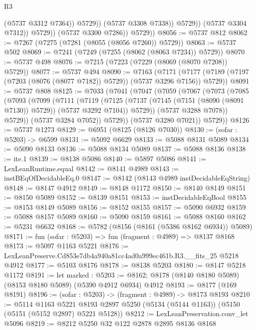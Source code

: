 \begin{lexlean}{R3}
\begin{coremodule}
                            (@5737 @3312 @7364))
                          @5729))
                      (@5737 @3308 @7338))
                    @5729))
                (@5737 @3304 @7312))
              @5729))
          (@5737 @3300 @7286))
        @5729))
@8056 := @5737 @812
@8062 := @7267 (@7275 (@7281 (@8055 (@8056 @7260)) @5729))
@8063 := @5737 @502
@8069 := @7241 (@7249 (@7255 (@8062 (@8063 @7234)) @5729))
@8070 := @5737 @498
@8076 := @7215 (@7223 (@7229 (@8069 (@8070 @7208)) @5729))
@8077 := @5737 @494
@8090 := @7163
    (@7171 (@7177 (@7189 (@7197 (@7203 (@8076 (@8077 @7182)) @5729)) (@5737 @3296 @7156)) @5729))
@8091 := @5737 @808
@8125 := @7033
    (@7041
      (@7047
        (@7059
          (@7067
            (@7073
              (@7085
                (@7093
                  (@7099
                    (@7111
                      (@7119
                        (@7125
                          (@7137 (@7145 (@7151 (@8090 (@8091 @7130)) @5729)) (@5737 @3292 @7104))
                          @5729))
                      (@5737 @3288 @7078))
                    @5729))
                (@5737 @3284 @7052))
              @5729))
          (@5737 @3280 @7021))
        @5729))
@8126 := @5737 @1273
@8129 := @6951 (@8125 (@8126 @7030))
@8130 := (sofar : @5203) -> @6599
@8131 := @5092 @6629
@8133 := @5088 @8131 @5089
@8134 := @5090 @8133
@8136 := @5088 @8134 @5089
@8137 := @5088 @8136
@8138 := ite.{1}
@8139 := @8138 @5086
@8140 := @5897 @5086
@8141 := LexLeanRuntime.equal
@8142 := @8141 @4989
@8143 := instBEqOfDecidableEq.{0}
@8147 := @8142 (@8143 @4989 instDecidableEqString)
@8148 := @8147 @4912
@8149 := @8148 @1172
@8150 := @8140 @8149
@8151 := @8150 @5089
@8152 := @8139 @8151
@8153 := instDecidableEqBool
@8155 := @8153 @8149 @5089
@8156 := @8152 @8155
@8157 := @5090 @6932
@8159 := @5088 @8157 @5089
@8160 := @5090 @8159
@8161 := @5088 @8160
@8162 := @5231 @6632
@8168 := @5782 (@8156 (@8161 (@5386 @8162 @6934)) @5089)
@8171 := fun (sofar : @5203) => fun (fragment : @4989) => @8137 @8168
@8173 := @5097 @1163 @5221
@8176 := LexLeanPreserve.Cd853e7db4a940a81cc4ad0a999ec461b.R3.__fits_25 @5218 @4912
@8177 := @5103 @8176
@8178 := @8138 @5203
@8180 := @8147 @5218 @1172
@8191 := let marked : @5203 := @8162;
  @8178 (@8140 @8180 @5089) (@8153 @8180 @5089) (@5390 @4912 @6934) @4912
@8193 := @8177 (@169 @8191)
@8196 := (sofar : @5203) -> (fragment : @4989) -> @8173 @8193
@8210 := @5114
    @1163
    @5221
    @8193
    @2897
    @5250
    (@5134 (@5144 @1163))
    (@5150 (@5151 (@5152 @2897) @5221 @5128))
@8212 := LexLeanPreservation.conv_let @5096
@8219 := @8212 @5250 @32 @122 @2878 @2895 @8136 @8168

\end{coremodule}
\end{lexlean}
